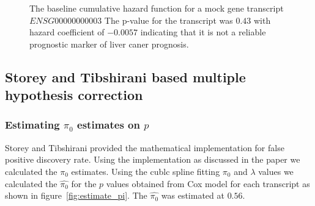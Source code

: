 \documentclass[9pt,twocolumn,twoside]{article}
\begin{document}
\begin{figure}[tbh]
    \centering
    \caption{The baseline cumulative hazard function for a mock gene transcript $ENSG00000000003$   The p-value for the transcript was $0.43$ with hazard coefficient of $-0.0057$ indicating that it is not a reliable prognostic marker of liver caner prognosis.}
    \label{fig:Baseline_hazard_and_survival}
\end{figure}
  		
	
	\subsection { Storey and Tibshirani \cite{storey2003statistical}  based multiple hypothesis correction }
	
	\subsubsection {Estimating $\pi_0$ estimates on $p$}
	
	Storey and Tibshirani \cite{storey2003statistical} provided the mathematical implementation for false positive discovery rate.  Using the implementation as discussed in the paper we calculated the $\pi_0$ estimates. Using the cublc spline fitting $\pi_0$ and  $\lambda$ values we calculated the  $\hat {\pi_0}$ for the $p$ values obtained from Cox model for each transcript as shown in figure~\ref{fig:estimate_pi}. The  $\hat {\pi_0}$  was estimated at $0.56$. 
\end{document}
